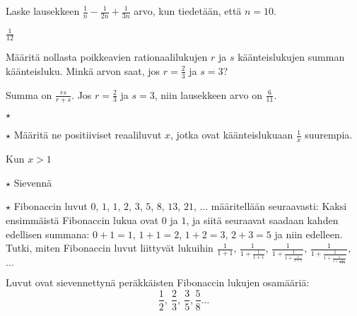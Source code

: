\begin{tehtavasivu}
\begin{tehtava}
	Laske lausekkeen $\frac{1}{n}-\frac{1}{2n}+\frac{1}{3n}$ arvo, kun tiedetään, että $n = 10$.
	\begin{vastaus}
		$\frac{1}{12}$
	\end{vastaus}
\end{tehtava}
\begin{tehtava}
	Määritä nollasta poikkeavien rationaalilukujen $r$ ja $s$ käänteislukujen summan käänteisluku. Minkä arvon saat, jos $r=\frac{2}{3}$ ja $s=3$?
	\begin{vastaus}
		Summa on $\frac{rs}{r+s}$. Jos $r=\frac{2}{3}$ ja $s=3$, niin lausekkeen arvo on $\frac{6}{11}$.
	\end{vastaus}
\end{tehtava}

\begin{tehtava} $\star$ 
	\begin{vastaus}
	\end{vastaus}
\end{tehtava}

\begin{tehtava} $\star$
	Määritä ne positiiviset reaaliluvut $x$, jotka ovat käänteislukuaan $\frac{1}{x}$ suurempia.
	\begin{vastaus}
	 Kun $x>1$
	\end{vastaus}
\end{tehtava}

\begin{tehtava} $\star $
Sievennä
 \begin{vastaus}
	\alakohdatm{
		§ $a+1$
		§ $4a$
	}
 \end{vastaus}
\end{tehtava}

\begin{tehtava}
	$\star$ Fibonaccin luvut $0$, $1$, $1$, $2$, $3$, $5$, $8$, $13$, $21$, $\ldots$ määritellään seuraavasti: Kaksi ensimmäistä Fibonaccin lukua ovat $0$ ja $1$, ja siitä seuraavat saadaan kahden edellisen summana: $0+1=1$, $1+1=2$, $1+2 = 3$, $2+3=5 $ ja niin edelleen. Tutki, miten Fibonaccin luvut liittyvät lukuihin
	$ \frac{1}{1+1}$, $\frac{1}{1+\frac{1}{1+1}}$, 
	$\frac{1}{1+\frac{1}{1+\frac{1}{1+1}}}$, 
	$\frac{1}{1+\frac{1}{1+\frac{1}{1+\frac{1}{1+1}}}}$, $\ldots\ $
	\begin{vastaus}
		Luvut ovat sievennettynä peräkkäisten Fibonaccin lukujen osamääriä:
		\[\frac{1}{2}, \ \frac{2}{3}, \ \frac{3}{5}, \frac{5}{8} \ldots  \]
	\end{vastaus}
\end{tehtava}

\end{tehtavasivu}
